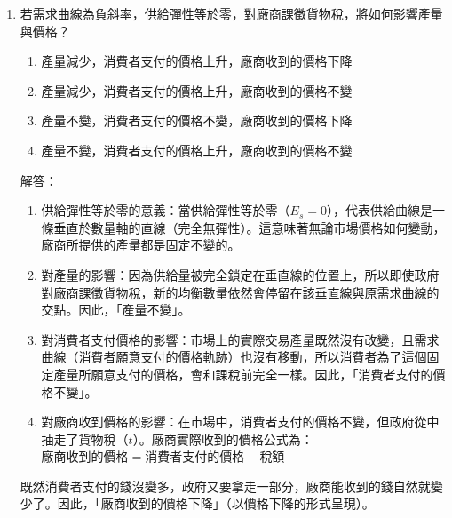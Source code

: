 \documentclass[12pt, a4paper]{article}
\begin{document}
\begin{enumerate}
    \item 若需求曲線為負斜率，供給彈性等於零，對廠商課徵貨物稅，將如何影響產量與價格？
    \begin{enumerate}[label=\Alph*.]
        \item 產量減少，消費者支付的價格上升，廠商收到的價格下降
        \item 產量減少，消費者支付的價格上升，廠商收到的價格不變
        \item 產量不變，消費者支付的價格不變，廠商收到的價格下降
        \item 產量不變，消費者支付的價格上升，廠商收到的價格不變
    \end{enumerate}
    解答：
    \begin{enumerate}[1.]
        \item 供給彈性等於零的意義：當供給彈性等於零（\(E_s = 0\)），代表供給曲線是一條垂直於數量軸的直線（完全無彈性）。這意味著無論市場價格如何變動，廠商所提供的產量都是固定不變的。
        \item 對產量的影響：因為供給量被完全鎖定在垂直線的位置上，所以即使政府對廠商課徵貨物稅，新的均衡數量依然會停留在該垂直線與原需求曲線的交點。因此，「產量不變」。
        \item 對消費者支付價格的影響：市場上的實際交易產量既然沒有改變，且需求曲線（消費者願意支付的價格軌跡）也沒有移動，所以消費者為了這個固定產量所願意支付的價格，會和課稅前完全一樣。因此，「消費者支付的價格不變」。
        \item 對廠商收到價格的影響：在市場中，消費者支付的價格不變，但政府從中抽走了貨物稅（\(t\)）。廠商實際收到的價格公式為：\(\text{廠商收到的價格} = \text{消費者支付的價格} - \text{稅額}\)
    \end{enumerate}
    既然消費者支付的錢沒變多，政府又要拿走一部分，廠商能收到的錢自然就變少了。因此，「廠商收到的價格下降」（以價格下降的形式呈現）。


\end{enumerate}
\end{document}

